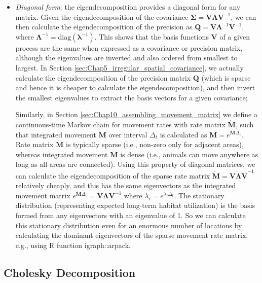 \begin{itemize}
    \item \textit{Diagonal form}:  the eigendecomposition provides a diagonal form for any matrix.  Given the eigendecomposition of the covariance \(\mathbf{\Sigma = V \Lambda V}^{-1} \), we can then calculate the eigendecomposition of the precision as \(\mathbf{Q = V \Lambda}^{-1} \mathbf{V}^{-1} \), where \(\mathbf{\Lambda}^{-1} = \text{diag}(\mathbf{\lambda}^{-1})\).  This shows that the basis functions \(\mathbf{V}\) of a given process are the same when expressed as a covariance or precision matrix, although the eigenvalues are inverted and also ordered from smallest to largest. In Section \ref{sec:Chap5_irregular_spatial_covariance}, we actually calculate the eigendecomposition of the precision matrix \(\mathbf{Q}\) (which is sparse and hence it is cheaper to calculate the eigendecomposition), and then invert the smallest eigenvalues to extract the basis vectors for a given covariance;  
    
    Similarly, in Section \ref{sec:Chap10_assembling_movement_matrix} we define a continuous-time Markov chain for movement rates with rate matrix \(\dot{\mathbf{M}}\), such that integrated movement \(\mathbf{M}\) over interval \(\Delta_t\) is calculated as \(\mathbf{M} = e^{\dot{\mathbf{M}}\Delta_t}\). Rate matrix \(\dot{\mathbf{M}}\) is typically sparse (i.e., non-zero only for adjacent areas), whereas integrated movement \(\mathbf{M}\) is dense (i.e., animals can move anywhere as long as all areas are connected).  Using this property of diagonal matrices, we can calculate the eigendecomposition of the sparse rate matrix \(\dot{\mathbf{M}} = \mathbf{V \dot{\Lambda} V}^{-1}\) relatively cheaply, and this has the same eigenvectors as the integrated movement matrix \(e^{\dot{\mathbf{M}}\Delta_t} = \mathbf{V \Lambda V}^{-1}\) where \( \lambda_i = e^{\dot{\lambda_i}\Delta_t}\).  The stationary distribution (representing expected long-term habitat utilization) is the basis formed from any eigenvectors with an eigenvalue of 1.  So we can calculate this stationary distribution even for an enormous number of locations by calculating the dominant eigenvectors of the sparse movement rate matrix, e.g., using R function \colorbox{backcolour}{igraph::arpack}. 
\end{itemize}

\subsection{Cholesky Decomposition} \label{sec:Appendix_Cholesky}

